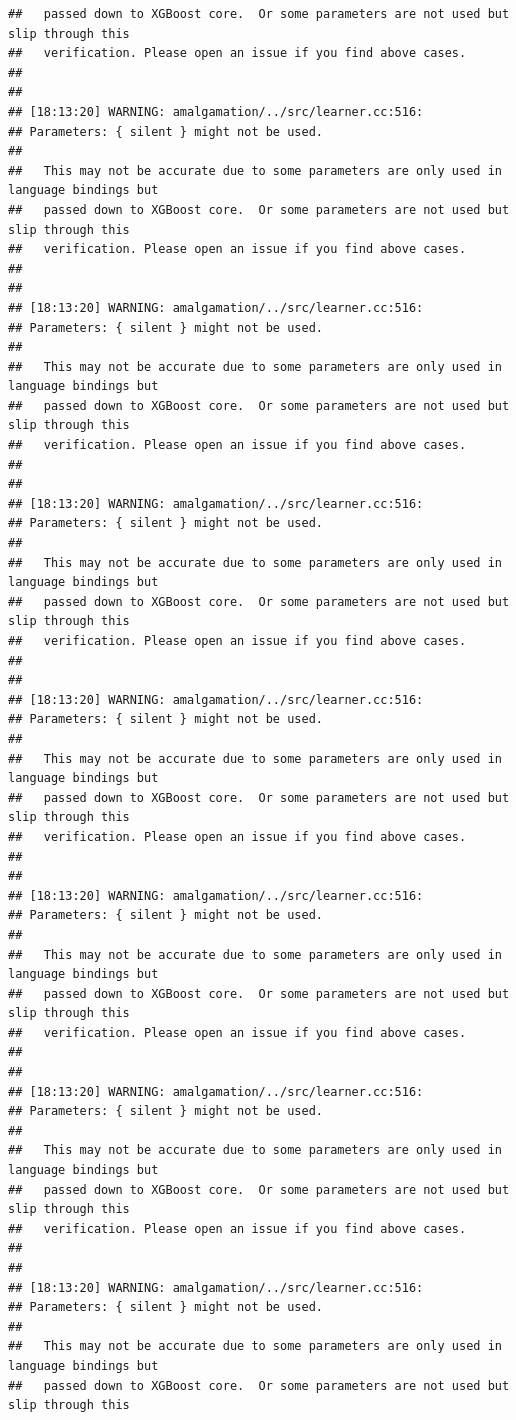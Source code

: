 \documentclass[AMS,STIX2COL]{WileyNJD-v2}\usepackage[]{graphicx}\usepackage[]{color}
\makeatletter
\newenvironment{kframe}{%
 \def\at@end@of@kframe{}%
 \ifinner\ifhmode%
  \def\at@end@of@kframe{\end{minipage}}%
  \begin{minipage}{\columnwidth}%
 \fi\fi%
 \def\FrameCommand##1{\hskip\@totalleftmargin \hskip-\fboxsep
 \colorbox{shadecolor}{##1}\hskip-\fboxsep
     \hskip-\linewidth \hskip-\@totalleftmargin \hskip\columnwidth}%
 \MakeFramed {\advance\hsize-\width
   \@totalleftmargin\z@ \linewidth\hsize
   \@setminipage}}%
 {\par\unskip\endMakeFramed%
 \at@end@of@kframe}
\newenvironment{knitrout}{}{} %
\makeatother
\begin{document}
\begin{knitrout}
\begin{kframe}
\begin{verbatim}
##   passed down to XGBoost core.  Or some parameters are not used but slip through this
##   verification. Please open an issue if you find above cases.
## 
## 
## [18:13:20] WARNING: amalgamation/../src/learner.cc:516: 
## Parameters: { silent } might not be used.
## 
##   This may not be accurate due to some parameters are only used in language bindings but
##   passed down to XGBoost core.  Or some parameters are not used but slip through this
##   verification. Please open an issue if you find above cases.
## 
## 
## [18:13:20] WARNING: amalgamation/../src/learner.cc:516: 
## Parameters: { silent } might not be used.
## 
##   This may not be accurate due to some parameters are only used in language bindings but
##   passed down to XGBoost core.  Or some parameters are not used but slip through this
##   verification. Please open an issue if you find above cases.
## 
## 
## [18:13:20] WARNING: amalgamation/../src/learner.cc:516: 
## Parameters: { silent } might not be used.
## 
##   This may not be accurate due to some parameters are only used in language bindings but
##   passed down to XGBoost core.  Or some parameters are not used but slip through this
##   verification. Please open an issue if you find above cases.
## 
## 
## [18:13:20] WARNING: amalgamation/../src/learner.cc:516: 
## Parameters: { silent } might not be used.
## 
##   This may not be accurate due to some parameters are only used in language bindings but
##   passed down to XGBoost core.  Or some parameters are not used but slip through this
##   verification. Please open an issue if you find above cases.
## 
## 
## [18:13:20] WARNING: amalgamation/../src/learner.cc:516: 
## Parameters: { silent } might not be used.
## 
##   This may not be accurate due to some parameters are only used in language bindings but
##   passed down to XGBoost core.  Or some parameters are not used but slip through this
##   verification. Please open an issue if you find above cases.
## 
## 
## [18:13:20] WARNING: amalgamation/../src/learner.cc:516: 
## Parameters: { silent } might not be used.
## 
##   This may not be accurate due to some parameters are only used in language bindings but
##   passed down to XGBoost core.  Or some parameters are not used but slip through this
##   verification. Please open an issue if you find above cases.
## 
## 
## [18:13:20] WARNING: amalgamation/../src/learner.cc:516: 
## Parameters: { silent } might not be used.
## 
##   This may not be accurate due to some parameters are only used in language bindings but
##   passed down to XGBoost core.  Or some parameters are not used but slip through this

\end{verbatim}
\end{kframe}
\end{knitrout}
\end{document}
